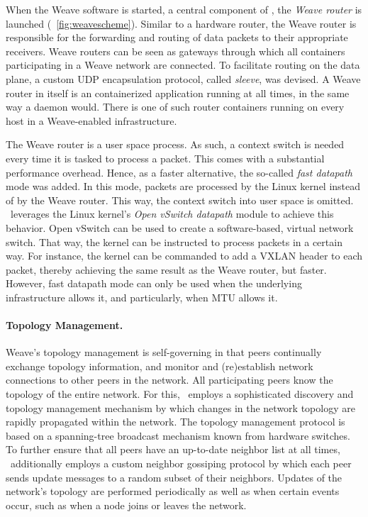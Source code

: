 When the Weave software is started, a central component of \wnet , the \emph{Weave router} is launched (\cf\ \autoref{fig:weavescheme}). Similar to a hardware router, the Weave router is responsible for the forwarding and routing of data packets to their appropriate receivers. Weave routers can be seen as gateways through which all containers participating in a Weave network are connected. To facilitate routing on the data plane, a custom UDP encapsulation protocol, called \emph{sleeve}, was devised. A Weave router in itself is an containerized application running at all times, in the same way a daemon would. There is one of such router containers running on every host in a Weave-enabled infrastructure.

The Weave router is a user space process. As such, a context switch is needed every time it is tasked to process a packet. This comes with a substantial performance overhead. Hence, as a faster alternative, the so-called \emph{fast datapath} mode was added. In this mode, packets are processed by the Linux kernel instead of by the Weave router. This way, the context switch into user space is omitted. \wnet\ leverages the Linux kernel's \emph{Open vSwitch datapath} module \cite{pfaff2015design} to achieve this behavior. Open vSwitch can be used to create a software-based, virtual network switch. That way, the kernel can be instructed to process packets in a certain way. For instance, the kernel can be commanded to add a VXLAN header to each packet, thereby achieving the same result as the Weave router, but faster. However, fast datapath mode can only be used when the underlying infrastructure allows it, and particularly, when MTU allows it.


\paragraph{Topology Management.} 
Weave's topology management is self-governing in that peers continually exchange topology information, and monitor and (re)establish network connections to other peers in the network. All participating peers know the topology of the entire network. For this, \wnet\ employs a sophisticated discovery and topology management mechanism by which changes in the network topology are rapidly propagated within the network. The topology management protocol is based on a spanning-tree broadcast mechanism known from hardware switches. To further ensure that all peers have an up-to-date neighbor list at all times, \wnet\ additionally employs a custom neighbor gossiping protocol by which each peer sends update messages to a random subset of their neighbors. Updates of the network's topology are performed periodically as well as when certain events occur, such as when a node joins or leaves the network.


